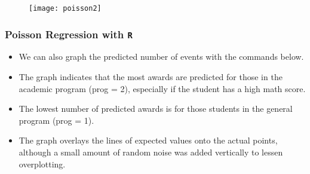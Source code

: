 \documentclass[00-GLMregslides.tex]{subfiles}
\begin{document}
\begin{frame}

\begin{figure}
\centering
\texttt{[image: poisson2]}
\end{figure}

\end{frame}
\begin{frame}[fragile]
\frametitle{Poisson Regression with \texttt{R}}
\Large

\begin{itemize}
\item We can also graph the predicted number of events with the commands below. 
\item The graph indicates that the most awards are predicted for those in the academic program (prog = 2), 
especially if the student has a high math score. 
\item The lowest number of predicted awards is for those students in the general program (prog = 1). 
\item The graph overlays the lines of expected values onto the actual points, although a small amount of random noise was added vertically to lessen overplotting.
\end{itemize}
\end{frame}
%
%
%
%
%
%
\end{document}
